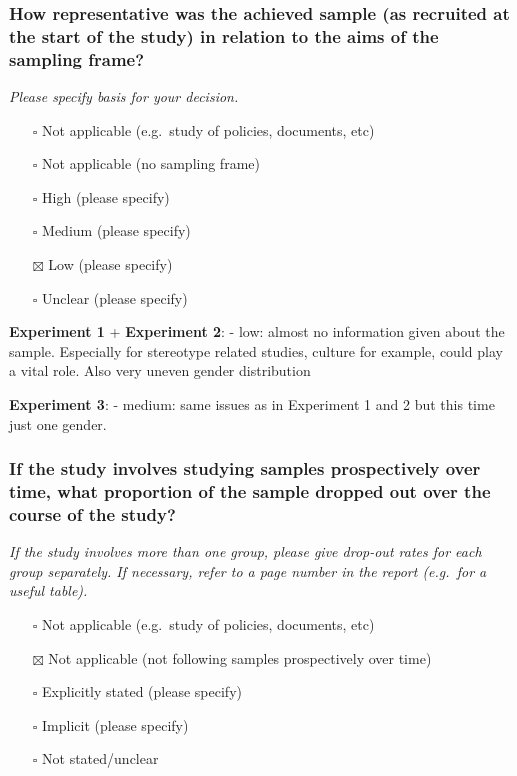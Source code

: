 \documentclass[
  doc, a4paper]{apa7}
\providecommand{\tightlist}{%
  \setlength{\itemsep}{0pt}\setlength{\parskip}{0pt}}
\begin{document}
\subsubsection{How representative was the achieved sample (as recruited at the start of the study) in relation to the aims of the sampling frame?}\label{how-representative-was-the-achieved-sample-as-recruited-at-the-start-of-the-study-in-relation-to-the-aims-of-the-sampling-frame}

\emph{Please specify basis for your decision.}

\begin{itemize}
\tightlist
\item[$\square$]
  Not applicable (e.g.~study of policies, documents, etc)
\item[$\square$]
  Not applicable (no sampling frame)
\item[$\square$]
  High (please specify)
\item[$\square$]
  Medium (please specify)
\item[$\boxtimes$]
  Low (please specify)
\item[$\square$]
  Unclear (please specify)
\end{itemize}

\textbf{Experiment 1} + \textbf{Experiment 2}:
- low: almost no information given about the sample. Especially for stereotype related studies, culture for example, could play a vital role. Also very uneven gender distribution

\textbf{Experiment 3}:
- medium: same issues as in Experiment 1 and 2 but this time just one gender.

\subsubsection{If the study involves studying samples prospectively over time, what proportion of the sample dropped out over the course of the study?}\label{if-the-study-involves-studying-samples-prospectively-over-time-what-proportion-of-the-sample-dropped-out-over-the-course-of-the-study}

\emph{If the study involves more than one group, please give drop-out rates for each group separately. If necessary, refer to a page number in the report (e.g.~for a useful table).}

\begin{itemize}
\tightlist
\item[$\square$]
  Not applicable (e.g.~study of policies, documents, etc)
\item[$\boxtimes$]
  Not applicable (not following samples prospectively over time)
\item[$\square$]
  Explicitly stated (please specify)
\item[$\square$]
  Implicit (please specify)
\item[$\square$]
  Not stated/unclear
\end{itemize}
\end{document}
